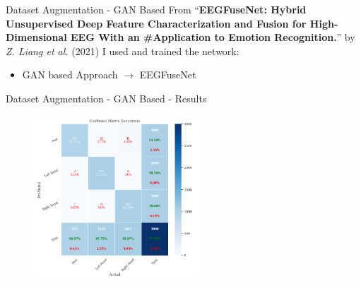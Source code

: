 \begin{frame}{Dataset Augmentation - GAN Based}
    From ``\textbf{EEGFuseNet: Hybrid Unsupervised Deep Feature Characterization and Fusion for High-Dimensional EEG With an \#Application to Emotion Recognition.}'' by \textit{Z. Liang et al.} (2021) I used and trained the network:
    \begin{itemize}
        \item GAN based Approach $\rightarrow{}$ EEGFuseNet
    \end{itemize}
\end{frame}
\begin{frame}{Dataset Augmentation - GAN Based - Results}
    \begin{figure}[htpb!]
        \centering
        \includegraphics[width=0.55\textwidth]{figures/augmentation/gan/confusion_matrix_generators_generators_using_LSTMNet_0.5943600867678959.pkl.png}
    \end{figure}
\end{frame}

